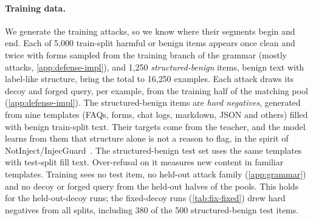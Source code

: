 \paragraph{Training data.}
We generate the training attacks, so we know where their segments begin and end.
Each of 5{,}000 train-split harmful or benign items appears once clean and twice with forms sampled from the training branch of the grammar (mostly attacks, \cref{app:defense-impl}), and 1{,}250 \emph{structured-benign} items, benign text with label-like structure, bring the total to 16{,}250 examples. %
Each attack draws its decoy and forged query, per example, from the training half of the matching pool (\cref{app:defense-impl}). %
The structured-benign items are \emph{hard negatives}, generated from nine templates (FAQs, forms, chat logs, markdown, JSON and others) filled with benign train-split text.
Their targets come from the teacher, and the model learns from them that structure alone is not a reason to flag, in the spirit of NotInject/InjecGuard~\citep{li2024injecguard}. %
The structured-benign test set uses the same templates with test-split fill text. Over-refusal on it measures new content in familiar templates.
Training sees no test item, no held-out attack family (\cref{app:grammar}) and no decoy or forged query from the held-out halves of the pools.
This holds for the held-out-decoy runs; the fixed-decoy runs (\cref{tab:fix-fixed}) drew hard negatives from all splits, including 380 of the 500 structured-benign test items. %
